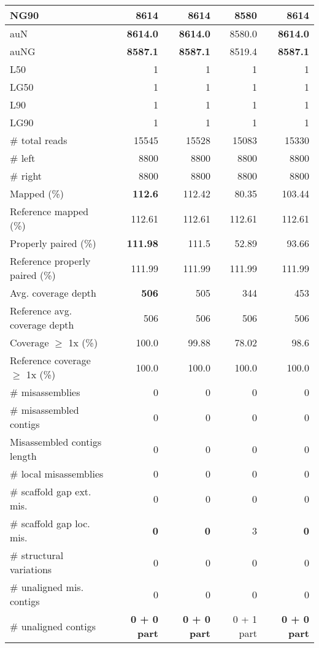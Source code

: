 \documentclass[12pt,a4paper]{article}
\begin{document}
\begin{table}[ht]
\begin{center}
\begin{tabular}{|l*{4}{|r}|}
NG90 & {\bf 8614} & {\bf 8614} & 8580 & {\bf 8614} \\ \hline
auN & {\bf 8614.0} & {\bf 8614.0} & 8580.0 & {\bf 8614.0} \\ \hline
auNG & {\bf 8587.1} & {\bf 8587.1} & 8519.4 & {\bf 8587.1} \\ \hline
L50 & 1 & 1 & 1 & 1 \\ \hline
LG50 & 1 & 1 & 1 & 1 \\ \hline
L90 & 1 & 1 & 1 & 1 \\ \hline
LG90 & 1 & 1 & 1 & 1 \\ \hline
\# total reads & 15545 & 15528 & 15083 & 15330 \\ \hline
\# left & 8800 & 8800 & 8800 & 8800 \\ \hline
\# right & 8800 & 8800 & 8800 & 8800 \\ \hline
Mapped (\%) & {\bf 112.6} & 112.42 & 80.35 & 103.44 \\ \hline
Reference mapped (\%) & 112.61 & 112.61 & 112.61 & 112.61 \\ \hline
Properly paired (\%) & {\bf 111.98} & 111.5 & 52.89 & 93.66 \\ \hline
Reference properly paired (\%) & 111.99 & 111.99 & 111.99 & 111.99 \\ \hline
Avg. coverage depth & {\bf 506} & 505 & 344 & 453 \\ \hline
Reference avg. coverage depth & 506 & 506 & 506 & 506 \\ \hline
Coverage $\geq$ 1x (\%) & 100.0 & 99.88 & 78.02 & 98.6 \\ \hline
Reference coverage $\geq$ 1x (\%) & 100.0 & 100.0 & 100.0 & 100.0 \\ \hline
\# misassemblies & 0 & 0 & 0 & 0 \\ \hline
\# misassembled contigs & 0 & 0 & 0 & 0 \\ \hline
Misassembled contigs length & 0 & 0 & 0 & 0 \\ \hline
\# local misassemblies & 0 & 0 & 0 & 0 \\ \hline
\# scaffold gap ext. mis. & 0 & 0 & 0 & 0 \\ \hline
\# scaffold gap loc. mis. & {\bf 0} & {\bf 0} & 3 & {\bf 0} \\ \hline
\# structural variations & 0 & 0 & 0 & 0 \\ \hline
\# unaligned mis. contigs & 0 & 0 & 0 & 0 \\ \hline
\# unaligned contigs & {\bf 0 + 0 part} & {\bf 0 + 0 part} & 0 + 1 part & {\bf 0 + 0 part} \\ \hline

\end{tabular}
\end{center}
\end{table}
\end{document}

